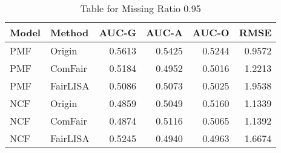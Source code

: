 \begin{table}
\centering
\caption{Table for Missing Ratio 0.95}
\label{tab:missing_0.95}
\begin{tabular}{llrrrr}
\toprule
Model &   Method &  AUC-G &  AUC-A &  AUC-O &   RMSE \\
\midrule
  PMF &   Origin & 0.5613 & 0.5425 & 0.5244 & 0.9572 \\
  PMF &  ComFair & 0.5184 & 0.4952 & 0.5016 & 1.2213 \\
  PMF & FairLISA & 0.5086 & 0.5073 & 0.5025 & 1.9538 \\
  NCF &   Origin & 0.4859 & 0.5049 & 0.5160 & 1.1339 \\
  NCF &  ComFair & 0.4874 & 0.5116 & 0.5065 & 1.1392 \\
  NCF & FairLISA & 0.5245 & 0.4940 & 0.4963 & 1.6674 \\
\bottomrule
\end{tabular}
\end{table}
